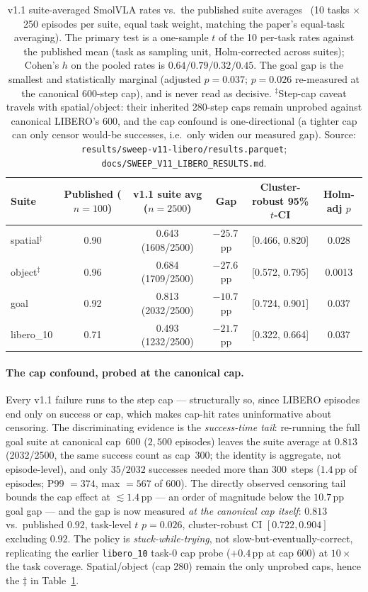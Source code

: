 \documentclass[10pt]{article}
\begin{document}
\begin{table}[t]
\centering
\small
\begin{tabular}{lccccc}
\toprule
Suite & Published ($n{=}100$) & v1.1 suite avg ($n{=}2500$) & Gap &
Cluster-robust 95\% $t$-CI & Holm-adj $p$ \\
\midrule
spatial$^\ddagger$ & 0.90 & 0.643 (1608/2500) & $-25.7$\,pp & [0.466, 0.820] & 0.028 \\
object$^\ddagger$  & 0.96 & 0.684 (1709/2500) & $-27.6$\,pp & [0.572, 0.795] & 0.0013 \\
goal               & 0.92 & 0.813 (2032/2500) & $-10.7$\,pp & [0.724, 0.901] & 0.037 \\
libero\_10         & 0.71 & 0.493 (1232/2500) & $-21.7$\,pp & [0.322, 0.664] & 0.037 \\
\bottomrule
\end{tabular}
\caption{v1.1 suite-averaged SmolVLA rates vs.\ the published suite
averages~\cite{shukor2025smolvla} (10 tasks $\times$ 250 episodes per
suite, equal task weight, matching the paper's equal-task averaging). The
primary test is a one-sample $t$ of the 10 per-task rates against the
published mean (task as sampling unit, Holm-corrected across suites);
Cohen's $h$ on the pooled rates is $0.64/0.79/0.32/0.45$. The goal gap is
the smallest and statistically marginal (adjusted $p{=}0.037$; $p{=}0.026$
re-measured at the canonical 600-step cap), and is never read as decisive.
$^\ddagger$Step-cap caveat travels with spatial/object: their inherited
280-step caps remain unprobed against canonical LIBERO's 600, and the cap
confound is one-directional (a tighter cap can only censor would-be
successes, i.e.\ only widen our measured gap). Source:
\texttt{results/sweep-v11-libero/results.parquet};
\texttt{docs/SWEEP\_V11\_LIBERO\_RESULTS.md}.}
\label{tab:suite-gap}
\end{table}

\paragraph{The cap confound, probed at the canonical cap.}
Every v1.1 failure runs to the step cap --- structurally so, since LIBERO
episodes end only on success or cap, which makes cap-hit rates
uninformative about censoring. The discriminating evidence is the
\emph{success-time tail}: re-running the full goal suite at canonical
cap~600 ($2{,}500$ episodes) leaves the suite average at $0.813$
(2032/2500, the same success count as cap~300; the identity is aggregate,
not episode-level), and only $35/2032$ successes needed more than
300~steps ($1.4$\,pp of episodes; P99 $=374$, max $=567$ of 600). The
directly observed censoring tail bounds the cap effect at
${\lesssim}1.4$\,pp --- an order of magnitude below the $10.7$\,pp goal
gap --- and the gap is now measured \emph{at the canonical cap itself}:
$0.813$ vs.\ published $0.92$, task-level $t$ $p{=}0.026$, cluster-robust
CI $[0.722, 0.904]$ excluding $0.92$. The policy is
\emph{stuck-while-trying}, not slow-but-eventually-correct, replicating
the earlier \texttt{libero\_10} task-0 cap probe ($+0.4$\,pp at cap 600)
at $10\times$ the task coverage. Spatial/object (cap 280) remain the only
unprobed caps, hence the $\ddagger$ in Table~\ref{tab:suite-gap}.
\end{document}
